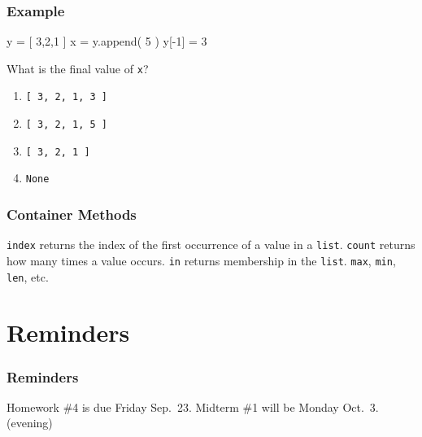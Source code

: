 \documentclass[11pt]{beamer}
\begin{document}
\begin{frame}[fragile]
  \frametitle{Example}
  \Enlarge

  \begin{semiverbatim}
y = [ 3,2,1 ]
x = y.append( 5 )
y[-1] = 3
  \end{semiverbatim}
  What is the final value of \texttt{x}?
  \begin{enumerate}[label=\Alph*]
  \item  \texttt{[ 3, 2, 1, 3 ]}
  \item  \texttt{[ 3, 2, 1, 5 ]}
  \item  \texttt{[ 3, 2, 1 ]}
  \item  \texttt{None}
  \end{enumerate}
\end{frame}

\begin{frame}[fragile]
  \frametitle{Container Methods}
  \Enlarge

  \begin{itemize}
  \myitem  \texttt{index} returns the index of the first occurrence of a value in a \texttt{list}.
  \myitem  \texttt{count} returns how many times a value occurs.
  \myitem  \texttt{in} returns membership in the \texttt{list}.
  \myitem  \texttt{max}, \texttt{min}, \texttt{len}, etc.
  \end{itemize}
\end{frame}

\section{Reminders}

\begin{frame}
  \frametitle{Reminders}
  \Enlarge

  \begin{itemize}
  \myitem  Homework \#4 is due Friday Sep.\ 23.
  \myitem  Midterm \#1 will be Monday Oct.\ 3.  (evening)
  \end{itemize}
\end{frame}
\end{document}
